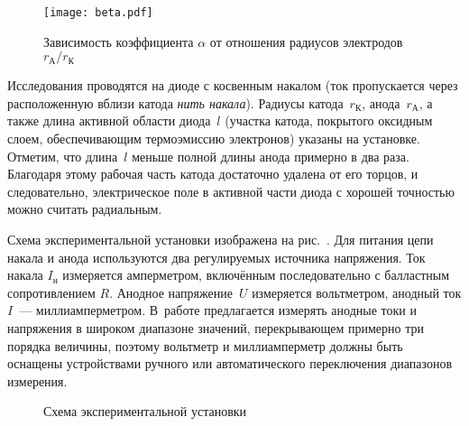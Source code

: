 \begin{figure}[h]
    \centering
    \texttt{[image: beta.pdf]}\par
    \caption{Зависимость коэффициента $\alpha$ от отношения радиусов
        электродов~$r_{А}/r_{К}$}
\end{figure}


\experiment 

Исследования проводятся на диоде с косвенным накалом (ток пропускается через 
расположенную вблизи катода \emph{нить накала}). Радиусы катода~$r_{К}$, 
анода~$r_{А}$, а также длина активной области диода~$l$ 
(участка катода, покрытого оксидным слоем, обеспечивающим
термоэмиссию электронов) указаны на установке. 
Отметим, что длина~$l$ меньше полной длины анода примерно в два раза. 
Благодаря этому рабочая часть катода достаточно 
удалена от его торцов, и следовательно,
электрическое поле в активной части диода с хорошей точностью можно считать радиальным.

Схема экспериментальной установки изображена на рис.~. Для
питания цепи накала и анода используются два регулируемых источника напряжения. 
Ток накала $I_{н}$ измеряется амперметром, включённым последовательно с
балластным сопротивлением $R$. Анодное напряжение~$U$ измеряется вольтметром, 
анодный ток $I$~--- миллиамперметром.
В~работе предлагается измерять анодные токи и напряжения в широком диапазоне 
значений, перекрывающем примерно три порядка величины, 
поэтому вольтметр и миллиамперметр должны быть оснащены устройствами 
ручного или автоматического переключения диапазонов измерения.

\begin{figure}[h!]
    \centering
    \caption{Схема экспериментальной установки}
\end{figure}

